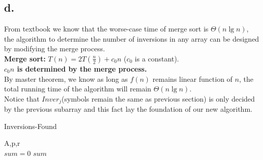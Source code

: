 \documentclass[oneside]{homework} %
\begin{document}
\subsection*{d.}
From textbook we know that the worse-case time of merge sort is $\Theta(n\lg{n})$, the algorithm to determine the number of inversions in any array can be designed by modifying the merge process.   
\\
\textbf{Merge sort:} $T(n) = 2T(\frac{n}{2})+c_{0}n$ ($c_{0}$ is a constant). 
\\
\textbf{$c_{0}n$ is determined by the merge process.}
\\By master theorem, we know as long as $f(n)$ remains linear function of $n$, the total running time of the algorithm will remain $\Theta(n\lg{n})$.
\\Notice that $Inver_{j}$(symbols remain the same as previous section) is only decided by the previous subarray and this fact lay the foundation of our new algorithm.
\newpage
  \begin{algorithm}[htb,!tp]
  \caption{Inversions-Found}
  \label{algo:inver}
  \begin{algorithmic}[1]
	\REQUIRE A,p,r
	\ENSURE ~ ~\\ 
	  \STATE $sum=0$
	  \ENDIF
	\LASTCON $sum$	
  \end{algorithmic}
  \end{algorithm}
\end{document}
